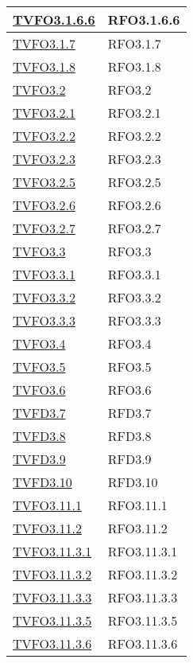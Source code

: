 \begin{longtable}{|>{\centering}m{5cm}|m{5cm}<{\centering}|}
\hyperlink{TVFO3.1.6.6}{TVFO3.1.6.6} & RFO3.1.6.6\\ \hline
\hyperlink{TVFO3.1.7}{TVFO3.1.7} & RFO3.1.7\\ \hline
\hyperlink{TVFO3.1.8}{TVFO3.1.8} & RFO3.1.8\\ \hline
\hyperlink{TVFO3.2}{TVFO3.2} & RFO3.2\\ \hline
\hyperlink{TVFO3.2.1}{TVFO3.2.1} & RFO3.2.1\\ \hline
\hyperlink{TVFO3.2.2}{TVFO3.2.2} & RFO3.2.2\\ \hline
\hyperlink{TVFO3.2.3}{TVFO3.2.3} & RFO3.2.3\\ \hline
\hyperlink{TVFO3.2.5}{TVFO3.2.5} & RFO3.2.5\\ \hline
\hyperlink{TVFO3.2.6}{TVFO3.2.6} & RFO3.2.6\\ \hline
\hyperlink{TVFO3.2.7}{TVFO3.2.7} & RFO3.2.7\\ \hline
\hyperlink{TVFO3.3}{TVFO3.3} & RFO3.3\\ \hline
\hyperlink{TVFO3.3.1}{TVFO3.3.1} & RFO3.3.1\\ \hline
\hyperlink{TVFO3.3.2}{TVFO3.3.2} & RFO3.3.2\\ \hline
\hyperlink{TVFO3.3.3}{TVFO3.3.3} & RFO3.3.3\\ \hline
\hyperlink{TVFO3.4}{TVFO3.4} & RFO3.4\\ \hline
\hyperlink{TVFO3.5}{TVFO3.5} & RFO3.5\\ \hline
\hyperlink{TVFO3.6}{TVFO3.6} & RFO3.6\\ \hline
\hyperlink{TVFD3.7}{TVFD3.7} & RFD3.7\\ \hline
\hyperlink{TVFD3.8}{TVFD3.8} & RFD3.8\\ \hline
\hyperlink{TVFD3.9}{TVFD3.9} & RFD3.9\\ \hline
\hyperlink{TVFD3.10}{TVFD3.10} & RFD3.10\\ \hline
\hyperlink{TVFO3.11.1}{TVFO3.11.1} & RFO3.11.1\\ \hline
\hyperlink{TVFO3.11.2}{TVFO3.11.2} & RFO3.11.2\\ \hline
\hyperlink{TVFO3.11.3.1}{TVFO3.11.3.1} & RFO3.11.3.1\\ \hline
\hyperlink{TVFO3.11.3.2}{TVFO3.11.3.2} & RFO3.11.3.2\\ \hline
\hyperlink{TVFO3.11.3.3}{TVFO3.11.3.3} & RFO3.11.3.3\\ \hline
\hyperlink{TVFO3.11.3.5}{TVFO3.11.3.5} & RFO3.11.3.5\\ \hline
\hyperlink{TVFO3.11.3.6}{TVFO3.11.3.6} & RFO3.11.3.6\\ \hline

\end{longtable}
